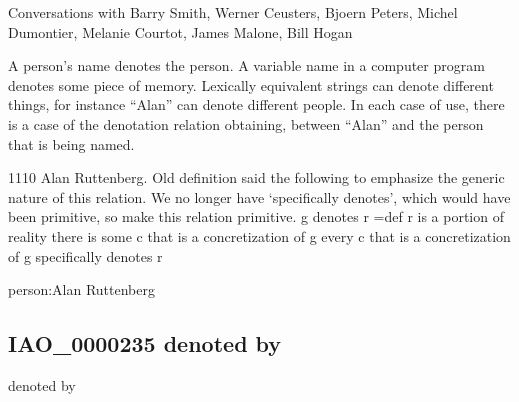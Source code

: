 \documentclass[letterpaper,10pt,english]{sphinxmanual}
\begin{document}
\begin{sphinxShadowBox}

\sphinxAtStartPar
Conversations with Barry Smith, Werner Ceusters, Bjoern Peters, Michel Dumontier, Melanie Courtot, James Malone, Bill Hogan
\end{sphinxShadowBox}

\begin{sphinxShadowBox}

\sphinxAtStartPar
A person’s name denotes the person. A variable name in a computer program denotes some piece of memory. Lexically equivalent strings can denote different things, for instance “Alan” can denote different people. In each case of use, there is a case of the denotation relation obtaining, between “Alan” and the person that is being named.
\end{sphinxShadowBox}

\begin{sphinxShadowBox}

\sphinxhyphen{}11\sphinxhyphen{}10 Alan Ruttenberg. Old definition said the following to emphasize the generic nature of this relation. We no longer have ‘specifically denotes’, which would have been primitive, so make this relation primitive.
g denotes r =def
r is a portion of reality
there is some c that is a concretization of g
every c that is a concretization of g specifically denotes r
\end{sphinxShadowBox}

\begin{sphinxShadowBox}

\sphinxAtStartPar
{}
\end{sphinxShadowBox}

\begin{sphinxShadowBox}

\sphinxAtStartPar
person:Alan Ruttenberg
\end{sphinxShadowBox}
\begin{quote}

\ignorespaces \end{quote}


\subsection{IAO\_0000235 \sphinxhyphen{} denoted by}
\label{\detokenize{doc-IAO_0000235:iao-0000235-denoted-by}}\label{\detokenize{doc-IAO_0000235:index-0}}\label{\detokenize{doc-IAO_0000235::doc}}
\begin{sphinxShadowBox}

\sphinxAtStartPar
denoted by
\end{sphinxShadowBox}
\end{document}
